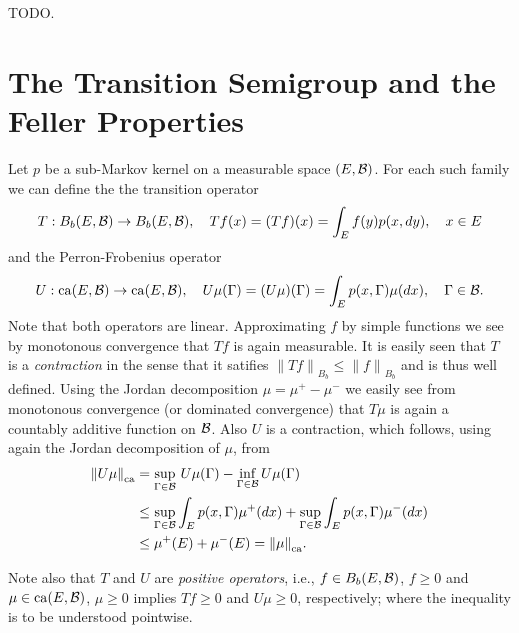 \documentclass[../Master.tex]{subfiles}
\begin{document}
\begin{nrremark}\label{rem:canonical_Markov_familiy}
  TODO.
\end{nrremark}


\section{The Transition Semigroup and the Feller Properties}

Let \(p\) be a sub-Markov kernel on a measurable space \((E,\mathcal{B})\). For each such family we can define the the transition operator
\begin{equation}\label{transition_operator}
  T: B_b (E,\mathcal{B} ) \to B_b (E,\mathcal{B}), \quad Tf(x) = (Tf)(x) = \int_E f(y) p(x, dy), \quad x \in E
\end{equation}
and the Perron-Frobenius operator
\begin{equation}\label{perron_frobenius_operator}
  U: \mathrm{ca}(E,\mathcal{B}) \to \mathrm{ca}(E,\mathcal{B}), \quad U \mu (\Gamma) = (U \mu) (\Gamma) = \int_E p(x, \Gamma) \mu(dx), \quad \Gamma \in \mathcal{B}.
\end{equation}
Note that both operators are linear. Approximating \(f \) by simple functions we see by monotonous convergence that \(Tf\) is again measurable. It is easily seen that \(T\) is a \emph{contraction} in the sense that it satifies \({\lVert Tf \rVert}_{B_b} \le {\lVert f \rVert}_{B_b}\) and is thus well defined.
Using the Jordan decomposition \(\mu = \mu^+ - \mu^-\) we easily see from monotonous convergence (or dominated convergence) that \(T \mu \) is again a countably additive function on \(\mathcal{B} \). Also \(U\) is a contraction, which follows, using again the Jordan decomposition of \(\mu \), from
\begin{equation*}
  \begin{aligned}
    {\lVert U \mu \rVert}_{\mathrm{ca}} &= \sup_{\Gamma \in \mathcal{B}} \, U \mu (\Gamma) - \inf_{\Gamma \in \mathcal{B}} U \mu (\Gamma) \\ &\le \sup_{\Gamma \in \mathcal{B}} \int_E p(x,\Gamma) \mu^+ (dx) + \sup_{\Gamma \in \mathcal{B}} \int_E p(x,\Gamma) \mu^-(dx) \\ &\le \mu^+ (E) + \mu^- (E) = {\lVert \mu \rVert}_{\mathrm{ca}}.
  \end{aligned}
\end{equation*}

Note also that \(T\) and \(U\) are \emph{positive operators}, i.e., \(f \in B_b(E,\mathcal{B})\), \(f \ge 0\) and \(\mu \in \mathrm{ca}(E,\mathcal{B})\), \(\mu \ge 0\) implies \(Tf \ge 0\) and \(U \mu \ge 0\), respectively; where the inequality is to be understood pointwise.
\end{document}
